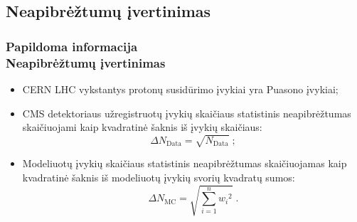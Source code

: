 \documentclass[xcolor=dvipsnames]{beamer}
\begin{document}
\begin{frame}
	\subsection{Neapibrėžtumų įvertinimas}
	\frametitle{Papildoma informacija\\ \small Neapibrėžtumų įvertinimas}
	\begin{itemize}
		\item CERN LHC vykstantys protonų susidūrimo įvykiai yra Puasono įvykiai;
		\item CMS detektoriaus užregistruotų įvykių skaičiaus statistinis neapibrėžtumas skaičiuojami kaip kvadratinė šaknis iš įvykių skaičiaus:
		\begin{equation*}
			\Delta \mathit{N}_\mathrm{Data} = \sqrt{\mathit{N}_\mathrm{Data}} \; ;
		\end{equation*}
		\item Modeliuotų įvykių skaičiaus statistinis neapibrėžtumas skaičiuojamas kaip kvadratinė šaknis iš modeliuotų įvykių svorių kvadratų sumos:
		\begin{equation*}
			\Delta \mathit{N}_\mathrm{MC} = \sqrt{\sum_{\mathit{i}=1}^{\mathit{n}}\mathit{w_{i}}^{2}} \; .
		\end{equation*}
	\end{itemize}
\end{frame}
\end{document}
